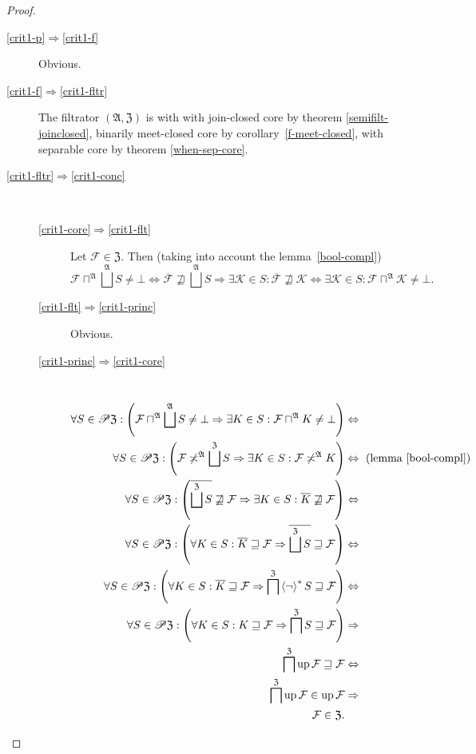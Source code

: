 \begin{proof}
~
\begin{description}
\item [{\ref{crit1-p}$\Rightarrow$\ref{crit1-f}}] Obvious.
\item [{\ref{crit1-f}$\Rightarrow$\ref{crit1-fltr}}] The filtrator $(\mathfrak{A},\mathfrak{Z})$
is with with join-closed core by theorem \ref{semifilt-joinclosed},
binarily meet-closed core by corollary~\ref{f-meet-closed}, with
separable core by theorem \ref{when-sep-core}.
\item [{\ref{crit1-fltr}$\Rightarrow$\ref{crit1-conc}}] ~

\begin{description}
\item [{\ref{crit1-core}$\Rightarrow$\ref{crit1-flt}}] Let $\mathcal{F}\in\mathfrak{Z}$.
Then (taking into account the lemma~\ref{bool-compl})
\[
\mathcal{F}\sqcap^{\mathfrak{A}}\bigsqcup^{\mathfrak{A}}S\ne\bot\Leftrightarrow\overline{\mathcal{F}}\nsqsupseteq\bigsqcup^{\mathfrak{A}}S\Rightarrow\exists\mathcal{K}\in S:\overline{\mathcal{F}}\nsqsupseteq\mathcal{K}\Leftrightarrow\exists\mathcal{K}\in S:\mathcal{F}\sqcap^{\mathfrak{A}}\mathcal{K}\ne\bot.
\]

\item [{\ref{crit1-flt}$\Rightarrow$\ref{crit1-princ}}] Obvious.
\item [{\ref{crit1-princ}$\Rightarrow$\ref{crit1-core}}] ~
\begin{align*}
\forall S\in\subsets\mathfrak{Z}:\left(\mathcal{F}\sqcap^{\mathfrak{A}}\bigsqcup^{\mathfrak{A}}S\ne\bot\Rightarrow\exists K\in S:\mathcal{F}\sqcap^{\mathfrak{A}}K\ne\bot\right) & \Leftrightarrow\\
\forall S\in\subsets\mathfrak{Z}:\left(\mathcal{F}\nasymp^{\mathfrak{A}}\bigsqcup^{\mathfrak{Z}}S\Rightarrow\exists K\in S:\mathcal{F}\nasymp^{\mathfrak{A}}K\right) & \Leftrightarrow\text{ (lemma \ref{bool-compl})}\\
\forall S\in\subsets\mathfrak{Z}:\left(\overline{\bigsqcup^{\mathfrak{Z}}S}\nsqsupseteq\mathcal{F}\Rightarrow\exists K\in S:\overline{K}\nsqsupseteq\mathcal{F}\right) & \Leftrightarrow\\
\forall S\in\subsets\mathfrak{Z}:\left(\forall K\in S:\overline{K}\sqsupseteq\mathcal{F}\Rightarrow\overline{\bigsqcup^{\mathfrak{Z}}S}\sqsupseteq\mathcal{F}\right) & \Leftrightarrow\\
\forall S\in\subsets\mathfrak{Z}:\left(\forall K\in S:\overline{K}\sqsupseteq\mathcal{F}\Rightarrow\bigsqcap^{\mathfrak{Z}}\rsupfun{\lnot}S\sqsupseteq\mathcal{F}\right) & \Leftrightarrow\\
\forall S\in\subsets\mathfrak{Z}:\left(\forall K\in S:K\sqsupseteq\mathcal{F}\Rightarrow\bigsqcap^{\mathfrak{Z}}S\sqsupseteq\mathcal{F}\right) & \Rightarrow\\
\bigsqcap^{\mathfrak{Z}}\up\mathcal{F}\sqsupseteq\mathcal{F} & \Leftrightarrow\\
\bigsqcap^{\mathfrak{Z}}\up\mathcal{F}\in\up\mathcal{F} & \Rightarrow\\
\mathcal{F}\in\mathfrak{Z}.
\end{align*}


\end{description}
\end{description}
\end{proof}
